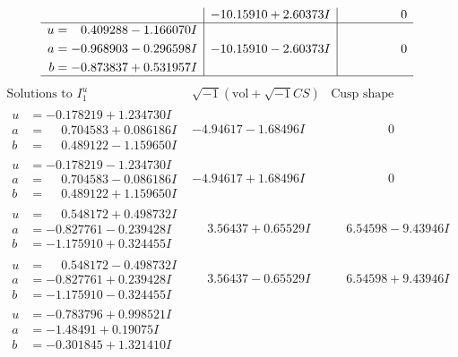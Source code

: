 \documentclass[1p]{elsarticle_modified}
\theoremstyle{definition}
\newcommand{\I}{\sqrt{-1}}
\begin{document}
$$\begin{array}{c|c|c}
 & -10.15910 + 2.60373 I & \phantom{-0.000000 } 0 \\ \hline\begin{aligned}
u &= \phantom{-}0.409288 - 1.166070 I \\
a &= -0.968903 - 0.296598 I \\
b &= -0.873837 + 0.531957 I\end{aligned}
 & -10.15910 - 2.60373 I & \phantom{-0.000000 } 0\\
 \hline 
 \end{array}$$\newpage$$\begin{array}{c|c|c}  
\text{Solutions to }I^u_{1}& \I (\text{vol} + \sqrt{-1}CS) & \text{Cusp shape}\\
 \hline 
\begin{aligned}
u &= -0.178219 + 1.234730 I \\
a &= \phantom{-}0.704583 + 0.086186 I \\
b &= \phantom{-}0.489122 - 1.159650 I\end{aligned}
 & -4.94617 - 1.68496 I & \phantom{-0.000000 } 0 \\ \hline\begin{aligned}
u &= -0.178219 - 1.234730 I \\
a &= \phantom{-}0.704583 - 0.086186 I \\
b &= \phantom{-}0.489122 + 1.159650 I\end{aligned}
 & -4.94617 + 1.68496 I & \phantom{-0.000000 } 0 \\ \hline\begin{aligned}
u &= \phantom{-}0.548172 + 0.498732 I \\
a &= -0.827761 - 0.239428 I \\
b &= -1.175910 + 0.324455 I\end{aligned}
 & \phantom{-}3.56437 + 0.65529 I & \phantom{-}6.54598 - 9.43946 I \\ \hline\begin{aligned}
u &= \phantom{-}0.548172 - 0.498732 I \\
a &= -0.827761 + 0.239428 I \\
b &= -1.175910 - 0.324455 I\end{aligned}
 & \phantom{-}3.56437 - 0.65529 I & \phantom{-}6.54598 + 9.43946 I \\ \hline\begin{aligned}
u &= -0.783796 + 0.998521 I \\
a &= -1.48491 + 0.19075 I \\
b &= -0.301845 + 1.321410 I\end{aligned}

\end{array}$$
\end{document}
